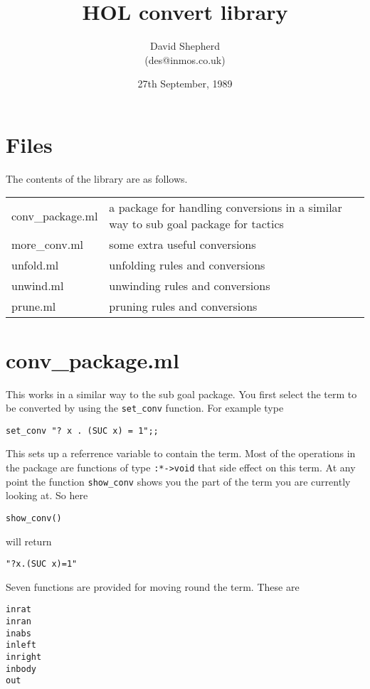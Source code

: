 
\baselineskip
\parindent=0pt

\title{HOL convert library}
\author{David Shepherd\\(des@inmos.co.uk)}
\date{27th September, 1989}


\maketitle

\section*{Files}

The contents of the library are as follows.

\begin{tabular}{lp{3in}}
conv\_package.ml & a package for handling conversions in a similar way to sub goal package for tactics\\
more\_conv.ml    & some extra useful conversions\\
unfold.ml & unfolding rules and conversions\\
unwind.ml & unwinding rules and conversions\\
prune.ml & pruning rules and conversions
\end{tabular}


\section*{conv\_package.ml}

This works in a similar way to the sub goal package. You first select the term to be converted
by using the \verb!set_conv! function. For example type

\verb!set_conv "? x . (SUC x) = 1";;!

This sets up a referrence variable to contain the term. Most of the operations in the package are
functions of type \verb!:*->void! that side effect on this term.
At any point the function \verb!show_conv! shows you the part of the term you are currently looking at.
So here

\verb!show_conv()!

will return

\verb!"?x.(SUC x)=1"!

Seven functions are provided for moving round the term. These are

\begin{verbatim}
inrat
inran
inabs
inleft
inright
inbody
out
\end{verbatim}


